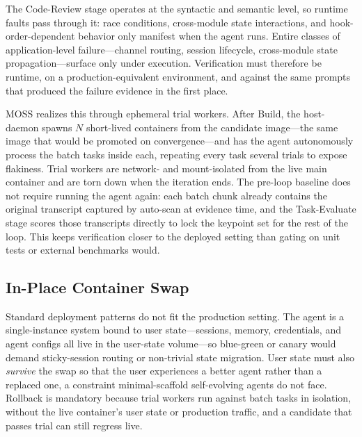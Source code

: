 \documentclass{article}
\begin{document}
The Code-Review stage operates at the syntactic and semantic level, so runtime faults pass through it: race conditions, cross-module state interactions, and hook-order-dependent behavior only manifest when the agent runs. Entire classes of application-level failure---channel routing, session lifecycle, cross-module state propagation---surface only under execution. Verification must therefore be runtime, on a production-equivalent environment, and against the same prompts that produced the failure evidence in the first place.

MOSS realizes this through ephemeral trial workers. After Build, the host-daemon spawns $N$ short-lived containers from the candidate image---the same image that would be promoted on convergence---and has the agent autonomously process the batch tasks inside each, repeating every task several trials to expose flakiness. Trial workers are network- and mount-isolated from the live main container and are torn down when the iteration ends. The pre-loop baseline does not require running the agent again: each batch chunk already contains the original transcript captured by auto-scan at evidence time, and the Task-Evaluate stage scores those transcripts directly to lock the keypoint set for the rest of the loop. This keeps verification closer to the deployed setting than gating on unit tests or external benchmarks would.

\subsection{In-Place Container Swap}
\label{subsec:swap}

Standard deployment patterns do not fit the production setting. The agent is a single-instance system bound to user state---sessions, memory, credentials, and agent configs all live in the user-state volume---so blue-green or canary would demand sticky-session routing or non-trivial state migration. User state must also \emph{survive} the swap so that the user experiences a better agent rather than a replaced one, a constraint minimal-scaffold self-evolving agents do not face. Rollback is mandatory because trial workers run against batch tasks in isolation, without the live container's user state or production traffic, and a candidate that passes trial can still regress live.
\end{document}
